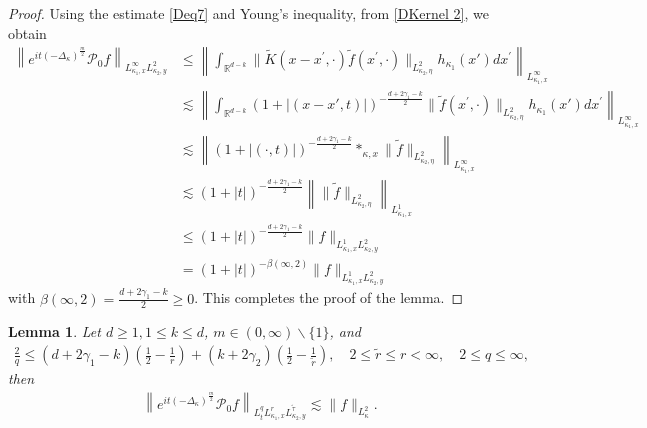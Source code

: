 \documentclass[a4paper,11pt, reqno]{amsart}
\newtheorem{lem}[theorem]{Lemma}
\theoremstyle{definition}
\theoremstyle{remark}
\numberwithin{equation}{section}
\begin{document}
\begin{proof}
		Using  the estimate  \eqref{Deq7} and   Young's inequality, from \eqref{DKernel 2},  we obtain 
		$$
		\begin{aligned}
			\left\|e^{i t(-\Delta_\kappa)^{\frac{m}{2}}}\mathcal{P}_0 f\right\|_{L_{\kappa_1, x}^{\infty} L_{\kappa_2, y}^2} 
			&\leq	\left\|\int_{\mathbb{R}^{d-k}} \| \widetilde{K}\left(x-x^{\prime}, \cdot\right) \tilde{f}\left(x^{\prime}, \cdot\right) \|_{L_{\kappa_2, \eta}^2}h_{\kappa_1}(x')   d x^{\prime}\right\|_{L_{\kappa_1, x}^{\infty}}\\
			&	\lesssim 	\left\|\int_{\mathbb{R}^{d-k}}  (1+|(x-x', t)|)^{-\frac{d+2\gamma_1-k}{2}}\|   \tilde{f}\left(x^{\prime}, \cdot\right) \|_{L_{\kappa_2, \eta}^2} h_{\kappa_1}(x')   d x^{\prime}\right\|_{L_{\kappa_1, x}^{\infty}}\\ & \lesssim\left\|(1+|(\cdot, t)|)^{-\frac{d+2\gamma_1-k}{2}} *_{\kappa,x} \| \tilde{f} \|_{L_{\kappa_2, \eta}^2}\right\|_{L_{\kappa_1, x}^{\infty}} \\
			& \lesssim(1+|t|)^{-\frac{d+2\gamma_1-k}{2}}\left \| \| \tilde{f} \|_{L_{\kappa_2, \eta}^2}\right\|_{L_{\kappa_1, x}^1} \\
			& \leq(1+|t|)^{-\frac{d+2\gamma_1-k}{2}}\|f\|_{L_{\kappa_1, x}^1 L_{\kappa_2, y}^2}\\
			& =(1+|t|)^{-\beta(\infty, 2)}\|f\|_{L_{\kappa_1, x}^1 L_{\kappa_2, y}^2} 
		\end{aligned}
		$$
		with $ \beta(\infty, 2)=\frac{d+2\gamma_1-k}{2} \geq 0$. This completes the proof of the lemma.  
	\end{proof}
 	\begin{lem} 	Let $d \geq 1,1 \leq k \leq d$,    $m\in (0, \infty)\backslash \{1\}$, and 
		\begin{align*}
			\frac{2}{q} \leq(d+2\gamma_1-k)\left(\frac{1}{2}-\frac{1}{r}\right)+(k+2\gamma_2)\left(\frac{1}{2}-\frac{1}{\widetilde{r}}\right), \quad 2 \leq \widetilde{r} \leq r<\infty, \quad 2\leq q \leq \infty, 
		\end{align*}
		then  
		\begin{align}\label{Deq4}
			\left\|e^{i t(-\Delta_\kappa)^{\frac{m}{2}} } \mathcal{P}_0 f\right\|_{L_t^q L_{\kappa_1, x}^r L_{\kappa_2, y}^{\tilde{\tau}}} \lesssim\|f\|_{L_{\kappa}^2}.
		\end{align}

	\end{lem}
\end{document}
